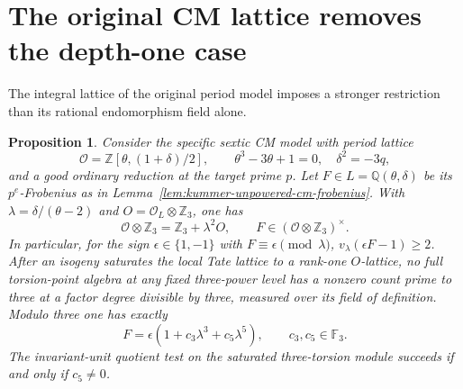 \documentclass[11pt]{article}
\newtheorem{proposition}[theorem]{Proposition}
\theoremstyle{definition}
\theoremstyle{remark}
\begin{document}
\section{The original CM lattice removes the depth-one case}
\label{sec:kummer-original-cm-lattice}
The integral lattice of the original period model imposes a stronger restriction than its rational endomorphism field alone.

\begin{proposition}\label{prop:kummer-original-cm-depth}
Consider the specific sextic CM model with period lattice
\[
 \mathcal O=\mathbb Z[\theta,(1+\delta)/2],\qquad
 \theta^3-3\theta+1=0,\quad\delta^2=-3q,
\]
and a good ordinary reduction at the target prime \(p\).
Let \(F\in L=\mathbb Q(\theta,\delta)\) be its
\(p^e\)-Frobenius as in
Lemma~\ref{lem:kummer-unpowered-cm-frobenius}.
With \(\lambda=\delta/(\theta-2)\) and
\(O=\mathcal O_L\otimes\mathbb Z_3\), one has
\[
 \mathcal O\otimes\mathbb Z_3=\mathbb Z_3+\lambda^2O,
 \qquad F\in(\mathcal O\otimes\mathbb Z_3)^\times.
\]
In particular, for the sign \(\epsilon\in\{1,-1\}\)
with \(F\equiv\epsilon\pmod\lambda\),
\(v_\lambda(\epsilon F-1)\ge2\).
After an isogeny saturates the local Tate lattice to a rank-one
\(O\)-lattice, no full torsion-point algebra at any fixed
three-power level has a nonzero count prime to three at a
factor degree divisible by three, measured over its field of
definition. Modulo three one has exactly
\[
 F=\epsilon(1+c_3\lambda^3+c_5\lambda^5),
 \qquad c_3,c_5\in\mathbb F_3.
\]
The invariant-unit quotient test on the saturated three-torsion
module succeeds if and only if \(c_5\ne0\).
\end{proposition}
\end{document}
